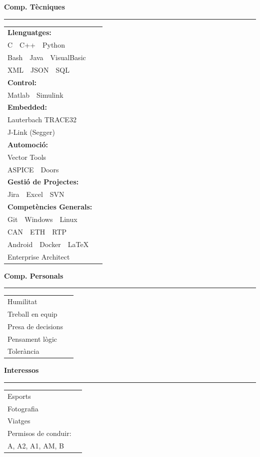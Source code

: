 \documentclass[11pt,a4paper]{article}
\newcommand{\cvsection}[1]{
    \vspace{0.5em}
    \noindent\textbf{\large #1}
    \vspace{0.5em}
    \hrule\vspace{0.5em}
}
\newcommand{\skillsep}{\ {\color{gray}\textbar}\ }
\begin{document}
\begin{minipage}{0.25\textwidth}
    \cvsection{Comp. Tècniques}
        \begin{tabular}{@{}ll@{}}
        \textbf{Llenguatges:}\\
          C\skillsep C++\skillsep Python \\
          Bash\skillsep Java\skillsep VisualBasic\\
          XML\skillsep JSON\skillsep SQL\\
        \textbf{Control:}\\
          Matlab\skillsep Simulink \\
        \textbf{Embedded:}\\
            Lauterbach TRACE32\\ 
            J-Link (Segger)\\
        \textbf{Automoció:}\\
          Vector Tools\\
          ASPICE\skillsep Doors\\
        \textbf{Gestió de Projectes:}\\
        Jira\skillsep Excel\skillsep SVN \\
        \textbf{Competències Generals:} \\
          Git\skillsep Windows\skillsep Linux\\
          CAN\skillsep ETH\skillsep RTP \\
          Android\skillsep Docker\skillsep LaTeX \\
          Enterprise Architect
          \end{tabular}
    
    \cvsection{Comp. Personals}
    \begin{tabular}{@{}ll@{}}
        Humilitat            \\
        Treball en equip    \\
        Presa de decisions     \\
        Pensament lògic    \\
        Tolerància
    \end{tabular}
    
    \cvsection{Interessos}
    \begin{tabular}{@{}ll@{}}
        Esports       \\
        Fotografia  \\
        Viatges\\
        Permisos de conduir: \\
        A, A2, A1, AM, B \\
    \end{tabular}
\end{minipage}
\end{document}

